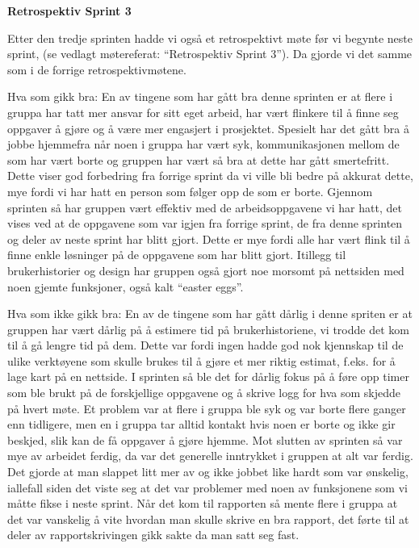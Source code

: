 \documentclass[12pt,a4paper,norsk]{article}
\begin{document}
\bigskip \noindent \textbf{Retrospektiv Sprint 3}
\par Etter den tredje sprinten hadde vi også et retrospektivt møte før vi begynte neste sprint, (se vedlagt møtereferat: “Retrospektiv Sprint 3”). Da gjorde vi det samme som i de forrige retrospektivmøtene. 

Hva som gikk bra:
En av tingene som har gått bra denne sprinten er at flere i gruppa har tatt mer ansvar for sitt eget arbeid, har vært flinkere til å finne seg oppgaver å gjøre og å være mer engasjert i prosjektet. Spesielt har det gått bra å jobbe hjemmefra når noen i gruppa har vært syk, kommunikasjonen mellom de som har vært borte og gruppen har vært så bra at dette har gått smertefritt. Dette viser god forbedring fra forrige sprint da vi ville bli bedre på akkurat dette, mye fordi vi har hatt en person som følger opp de som er borte. 
Gjennom sprinten så har gruppen vært effektiv med de arbeidsoppgavene vi har hatt, det vises ved at de oppgavene som var igjen fra forrige sprint, de fra denne sprinten og deler av neste sprint har blitt gjort. Dette er mye fordi alle har vært flink til å finne enkle løsninger på de oppgavene som har blitt gjort. 
Itillegg til brukerhistorier og design har gruppen også gjort noe morsomt på nettsiden med noen gjemte funksjoner, også kalt “easter eggs”.  

Hva som ikke gikk bra:
En av de tingene som har gått dårlig i denne spriten er at gruppen har vært dårlig på å estimere tid på brukerhistoriene, vi trodde det kom til å gå lengre tid på dem. Dette var fordi ingen hadde god nok kjennskap til de ulike verktøyene som skulle brukes til å gjøre et mer riktig estimat, f.eks. for å lage kart på en nettside.
I sprinten så ble det for dårlig fokus på å føre opp timer som ble brukt på de forskjellige oppgavene og å skrive logg for hva som skjedde på hvert møte. 
Et problem var at flere i gruppa ble syk og var borte flere ganger enn tidligere, men en i gruppa tar alltid kontakt hvis noen er borte og ikke gir beskjed, slik kan de få oppgaver å gjøre hjemme. 
Mot slutten av sprinten så var mye av arbeidet ferdig, da var det generelle inntrykket i gruppen at alt var ferdig. Det gjorde at man slappet litt mer av og ikke jobbet like hardt som var ønskelig, iallefall siden det viste seg at det var problemer med noen av funksjonene som vi måtte fikse i neste sprint. 
Når det kom til rapporten så mente flere i gruppa at det var vanskelig å vite hvordan man skulle skrive en bra rapport, det førte til at deler av rapportskrivingen gikk sakte da man satt seg fast.
\end{document}
